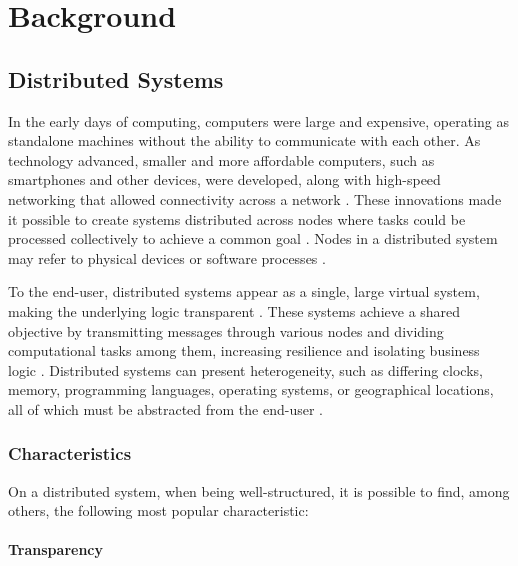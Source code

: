 
\chapter{Background} %

\label{chap:Background} %


\section{Distributed Systems}

In the early days of computing, computers were large and expensive, operating as standalone machines without the ability to communicate with each other. As technology advanced, smaller and more affordable computers, such as smartphones and other devices, were developed, along with high-speed networking that allowed connectivity across a network \cite{Tanenbaum2023}. These innovations made it possible to create systems distributed across nodes where tasks could be processed collectively to achieve a common goal \cite{Tanenbaum2023}. Nodes in a distributed system may refer to physical devices or software processes \cite{Vitillo2021}.


To the end-user, distributed systems appear as a single, large virtual system, making the underlying logic transparent \cite{Vitillo2021}. These systems achieve a shared objective by transmitting messages through various nodes and dividing computational tasks among them, increasing resilience and isolating business logic \cite{Sari2015, Vitillo2021}. Distributed systems can present heterogeneity, such as differing clocks, memory, programming languages, operating systems, or geographical locations, all of which must be abstracted from the end-user \cite{Sari2015, Tanenbaum2023}.

\subsection{Characteristics}

On a distributed system, when being well-structured, it is possible to find, among others, the following most popular characteristic:

\subsubsection{Transparency}

